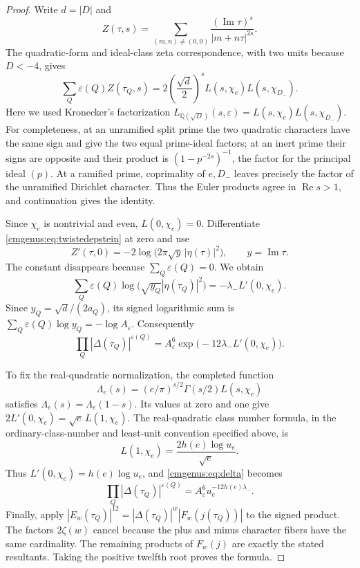 \begin{proof}
Write $d=|D|$ and
\[
 Z(\tau,s)=\sum_{(m,n)\neq(0,0)}
          \frac{(\operatorname{Im}\tau)^s}{|m+n\tau|^{2s}}.
\]
The quadratic-form and ideal-class zeta correspondence, with two units
because $D<-4$, gives
\begin{equation}
 \sum_Q\varepsilon(Q)Z(\tau_Q,s)
 =2\left(\frac{\sqrt d}{2}\right)^s
       L(s,\chi_e)L(s,\chi_{D_-}).
 \label{cmgenus:eq:twistedepstein}
\end{equation}
Here we used Kronecker's factorization
$L_{\mathbb Q(\sqrt D)}(s,\varepsilon)
=L(s,\chi_e)L(s,\chi_{D_-})$.
For completeness, at an unramified split prime the two quadratic
characters have the same sign and give the two equal prime-ideal
factors; at an inert prime their signs are opposite and their product
is $(1-p^{-2s})^{-1}$, the factor for the principal ideal $(p)$.
At a ramified prime, coprimality of $e,D_-$ leaves precisely the factor
of the unramified Dirichlet character. Thus the Euler products agree
in $\operatorname{Re}s>1$, and continuation gives the identity.

Since $\chi_e$ is nontrivial and even, $L(0,\chi_e)=0$.
Differentiate \eqref{cmgenus:eq:twistedepstein} at zero and use
\[
 Z'(\tau,0)=-2\log\bigl(2\pi\sqrt y\,|\eta(\tau)|^2\bigr),
 \qquad y=\operatorname{Im}\tau.
\]
The constant disappears because $\sum_Q\varepsilon(Q)=0$. We obtain
\begin{equation}
 \sum_Q\varepsilon(Q)\log\bigl(\sqrt{y_Q}
                                  |\eta(\tau_Q)|^2\bigr)
 =-\lambda_-L'(0,\chi_e).
 \label{cmgenus:eq:etaweighted}
\end{equation}
Since $y_Q=\sqrt d/(2a_Q)$, its signed logarithmic sum is
$\sum_Q\varepsilon(Q)\log y_Q=-\log A_\varepsilon$.
Consequently
\begin{equation}
 \prod_Q|\Delta(\tau_Q)|^{\varepsilon(Q)}
 =A_\varepsilon^6
       \exp\bigl(-12\lambda_-L'(0,\chi_e)\bigr).
 \label{cmgenus:eq:delta}
\end{equation}

To fix the real-quadratic normalization, the completed function
\[
 \Lambda_e(s)=(e/\pi)^{s/2}\Gamma(s/2)L(s,\chi_e)
\]
satisfies $\Lambda_e(s)=\Lambda_e(1-s)$.
Its values at zero and one give
$2L'(0,\chi_e)=\sqrt e\,L(1,\chi_e)$.
The real-quadratic class number formula, in the ordinary-class-number
and least-unit convention specified above, is
\[
 L(1,\chi_e)=\frac{2h(e)\log u_e}{\sqrt e}.
\]
Thus $L'(0,\chi_e)=h(e)\log u_e$, and
\eqref{cmgenus:eq:delta} becomes
\begin{equation}
 \boxed{\displaystyle
 \prod_Q|\Delta(\tau_Q)|^{\varepsilon(Q)}
 =A_\varepsilon^6 u_e^{-12h(e)\lambda_-}.}
 \label{cmgenus:eq:deltaunit}
\end{equation}
Finally, apply
$|E_w(\tau_Q)|^{12}
=|\Delta(\tau_Q)|^w|F_w(j(\tau_Q))|$ to the signed product.
The factors $2\zeta(w)$ cancel because the plus and minus character
fibers have the same cardinality. The remaining products of $F_w(j)$ are exactly the stated
resultants. Taking the positive twelfth root proves the formula.
\end{proof}

